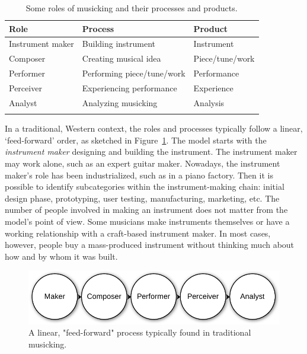 \begin{table}[tbp]
\begin{center}
\begin{tabular}{ l|l|l }
Role & Process & Product \\
 \hline
Instrument maker & Building instrument & Instrument \\
Composer & Creating musical idea & Piece/tune/work \\
Performer & Performing piece/tune/work & Performance \\
Perceiver & Experiencing performance & Experience \\
Analyst & Analyzing musicking & Analysis \\
\label{tab:musicking-in-time}
\end{tabular}
\caption{Some roles of musicking and their processes and products.}
\end{center}
\end{table}

In a traditional, Western context, the roles and processes typically follow a linear, `feed-forward' order, as sketched in Figure~\ref{fig:music-quadrant1}. The model starts with the \emph{instrument maker} designing and building the instrument. The instrument maker may work alone, such as an expert guitar maker. Nowadays, the instrument maker's role has been industrialized, such as in a piano factory. Then it is possible to identify subcategories within the instrument-making chain: initial design phase, prototyping, user testing, manufacturing, marketing, etc. The number of people involved in making an instrument does not matter from the model's point of view. Some musicians make instruments themselves or have a working relationship with a craft-based instrument maker. In most cases, however, people buy a mass-produced instrument without thinking much about how and by whom it was built.

\begin{figure}[tp]
\includegraphics[width=\columnwidth]{figures/03-luthier-analyst-crop.pdf}
\caption{A linear, "feed-forward" process typically found in traditional musicking.}
\label{fig:music-quadrant1}
\end{figure}

